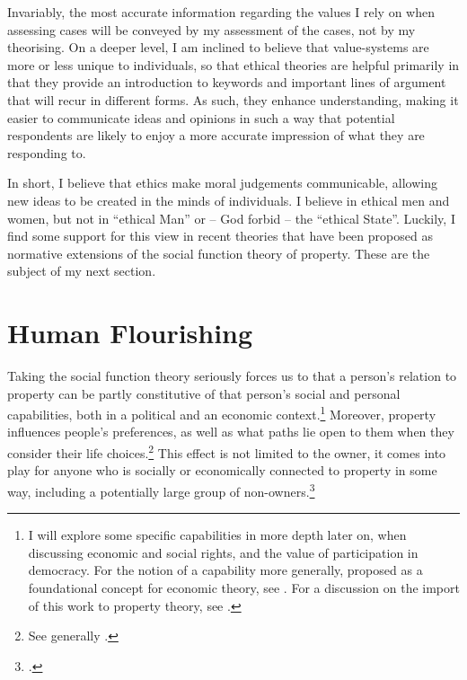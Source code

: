 {Invariably, the most accurate information regarding the values I rely on when assessing cases will be conveyed by my assessment of the cases, not by my theorising. On a deeper level, I am inclined to believe that value-systems are more or less unique to individuals, so that ethical theories are helpful primarily in that they provide an introduction to keywords and important lines of argument that will recur in different forms. As such, they enhance understanding, making it easier to communicate ideas and opinions in such a way that potential respondents are likely to enjoy a more accurate impression of what they are responding to. 

In short, I believe that ethics make moral judgements communicable, allowing new ideas to be created in the minds of individuals. I believe in ethical men and women, but not in ``ethical Man'' or -- God forbid -- the ``ethical State''. Luckily, I find some support for this view in recent theories that have been proposed as normative extensions of the social function theory of property. These are the subject of my next section.
}

\section{Human Flourishing}\label{sec:hf}

Taking the social function theory seriously forces us to  that a person's relation to property can be partly constitutive of that person's social and personal capabilities, both in a political and an economic context.\footnote{I will explore some specific capabilities in more depth later on, when discussing economic and social rights, and the value of participation in democracy. For the notion of a capability more generally, proposed as a foundational concept for economic theory, see \cite{sen85}. For a discussion on the import of this work to property theory, see \cite[105]{alexander09}.} Moreover, property influences people's preferences, as well as what paths lie open to them when they consider their life choices.\footnote{See generally \cite{alexander09}.} This effect is not limited to the owner, it comes into play for anyone who is socially or economically connected to property in some way, including a potentially large group of non-owners.\footcite[128-129]{alexander09d} %

